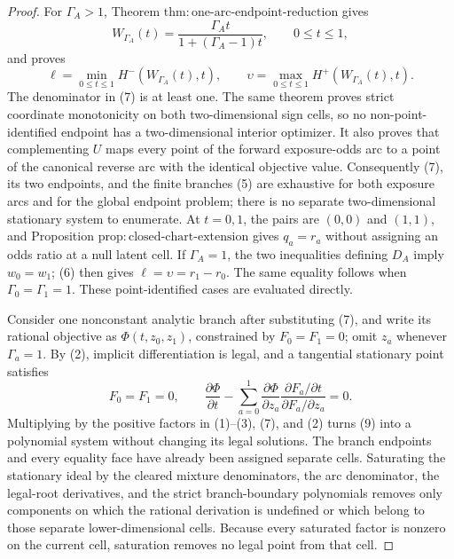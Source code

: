\documentclass{article}
\begin{document}
\begin{proof}
For \(\Gamma_A>1\), Theorem \(\mathrm{thm{:}one\text{-}arc\text{-}endpoint\text{-}reduction}\) gives
\[
 W_{\Gamma_A}(t)=\frac{\Gamma_A t}{1+(\Gamma_A-1)t},
 \qquad 0\leq t\leq1,                                                  \tag{7}
\]
and proves
\[
 \ell=\min_{0\leq t\leq1}H^-(W_{\Gamma_A}(t),t),
 \qquad
 \upsilon=\max_{0\leq t\leq1}H^+(W_{\Gamma_A}(t),t).                 \tag{8}
\]
The denominator in (7) is at least one.  The same theorem proves strict coordinate monotonicity on both two-dimensional sign cells, so no non-point-identified endpoint has a two-dimensional interior optimizer.  It also proves that complementing \(U\) maps every point of the forward exposure-odds arc to a point of the canonical reverse arc with the identical objective value.  Consequently (7), its two endpoints, and the finite branches (5) are exhaustive for both exposure arcs and for the global endpoint problem; there is no separate two-dimensional stationary system to enumerate.  At \(t=0,1\), the pairs are \((0,0)\) and \((1,1)\), and Proposition \(\mathrm{prop{:}closed\text{-}chart\text{-}extension}\) gives \(q_a=r_a\) without assigning an odds ratio at a null latent cell.  If \(\Gamma_A=1\), the two inequalities defining \(D_A\) imply \(w_0=w_1\); (6) then gives \(\ell=\upsilon=r_1-r_0\).  The same equality follows when \(\Gamma_0=\Gamma_1=1\).  These point-identified cases are evaluated directly.

Consider one nonconstant analytic branch after substituting (7), and write its rational objective as \(\Phi(t,z_0,z_1)\), constrained by \(F_0=F_1=0\); omit \(z_a\) whenever \(\Gamma_a=1\).  By (2), implicit differentiation is legal, and a tangential stationary point satisfies
\[
 F_0=F_1=0,
 \qquad
 \frac{\partial\Phi}{\partial t}
 -\sum_{a=0}^1
   \frac{\partial\Phi}{\partial z_a}
   \frac{\partial F_a/\partial t}{\partial F_a/\partial z_a}=0.        \tag{9}
\]
Multiplying by the positive factors in (1)--(3), (7), and (2) turns (9) into a polynomial system without changing its legal solutions.  The branch endpoints and every equality face have already been assigned separate cells.  Saturating the stationary ideal by the cleared mixture denominators, the arc denominator, the legal-root derivatives, and the strict branch-boundary polynomials removes only components on which the rational derivation is undefined or which belong to those separate lower-dimensional cells.  Because every saturated factor is nonzero on the current cell, saturation removes no legal point from that cell.


\end{proof}
\end{document}
